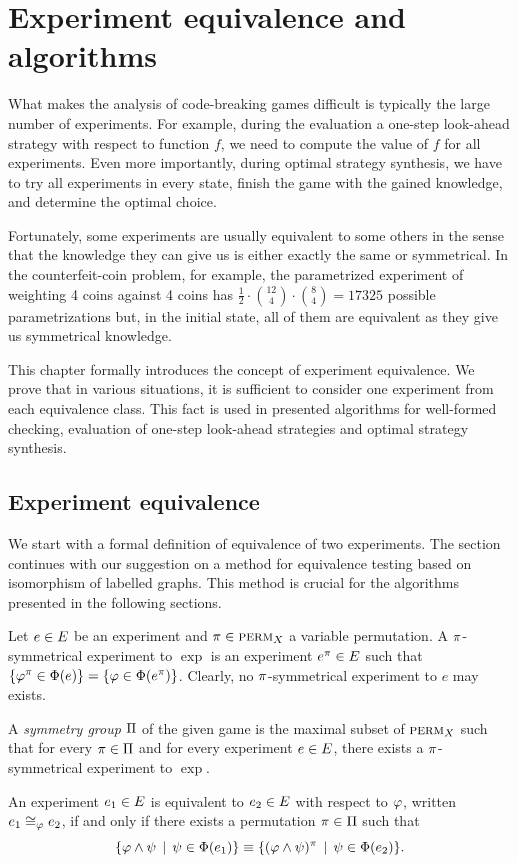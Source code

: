 \chapter{Experiment equivalence and algorithms} \label{ch:expeq}

What makes the analysis of code-breaking games difficult is
  typically the large number of experiments.
For example, during the evaluation a one-step look-ahead strategy with respect to function $f$,
  we need to compute the value of $f$ for all experiments.
Even more importantly,
  during optimal strategy synthesis,
  we have to try all experiments in every state,
  finish the game with the gained knowledge,
  and determine the optimal choice.

Fortunately, some experiments are usually equivalent to some others in the sense
  that the knowledge they can give us is either exactly the same or symmetrical.
In the counterfeit-coin problem, for example,
  the parametrized experiment of weighting 4 coins against 4 coins
  has $\frac{1}{2}\cdot {12 \choose 4}\cdot{8 \choose 4} = 17325$
  possible parametrizations but,
  in the initial state,
  all of them are equivalent
  as they give us symmetrical knowledge.

This chapter formally introduces the concept of experiment equivalence.
We prove that in various situations, it is sufficient to consider
  one experiment from each equivalence class.
This fact is used in presented algorithms for well-formed checking,
  evaluation of one-step look-ahead strategies and
  optimal strategy synthesis.

\section{Experiment equivalence}

We start with a formal definition of equivalence of two experiments.
The section continues with our suggestion on a method for equivalence testing
  based on isomorphism of labelled graphs.
This method is crucial for the algorithms presented in the following sections.

\begin{definition} \label{def:expeq}
Let $e\in E$ be an experiment and $\pi\in\textsc{perm}_X$ a variable permutation.
A $\pi$-symmetrical experiment to $\exp$ is an experiment
  $e^\pi\in E$
  such that
  $\{\varphi^\pi \in\Phi(e)\} = \{\varphi\in\Phi(e^\pi)\}$.
Clearly, no $\pi$-symmetrical experiment to $e$ may exists.

A \emph{symmetry group} $\Pi$ of the given game is
  the maximal subset of $\textsc{perm}_X$ such that for
  every $\pi\in\Pi$ and for every experiment $e\in E$,
  there exists a $\pi$-symmetrical experiment to $\exp$.

An experiment $e_1\in E$ is equivalent to $e_2\in E$ with respect to $\varphi$,
  written $e_1\cong_{\varphi}e_2$,
  if and only if there exists a permutation $\pi\in\Pi$ such that
 \[ \{ \varphi\wedge\psi \:\:|\:\: \psi\in\Phi(e_1) \} \equiv
   \{ (\varphi\wedge\psi)^\pi \:\:|\:\: \psi\in\Phi(e_2) \}. \]
\end{definition}

